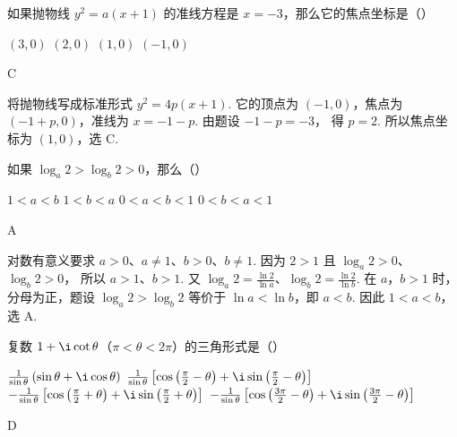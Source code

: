 \begin{problem}
如果抛物线 \(y^2=a(x+1)\) 的准线方程是 \(x=-3\)，那么它的焦点坐标是（\quad）

\choices
    {\((3,0)\)}
    {\((2,0)\)}
    {\((1,0)\)}
    {\((-1,0)\)}
\end{problem}

\begin{answer}
C
\end{answer}

\begin{solution}
将抛物线写成标准形式
\(y^2=4p(x+1)\).
它的顶点为 \((-1,0)\)，焦点为 \((-1+p,0)\)，准线为 \(x=-1-p\). 由题设
\(-1-p=-3\)，
得 \(p=2\). 所以焦点坐标为 \((1,0)\)，选 C.
\end{solution}

\begin{problem}
如果 \(\log_{a} 2 > \log_{b} 2 > 0 \)，那么（\quad）

\choices
    {\(1<a<b\)}
    {\(1<b<a\)}
    {\(0<a<b<1\)}
    {\(0<b<a<1\)}
\end{problem}

\begin{answer}
A
\end{answer}

\begin{solution}
对数有意义要求 \(a>0\)、\(a\ne1\)、\(b>0\)、\(b\ne1\). 因为 \(2>1\) 且
\(\log_a2>0\)、\(\log_b2>0\)，
所以 \(a>1\)、\(b>1\). 又
\(\log_a2=\frac{\ln2}{\ln a}\)、\(\log_b2=\frac{\ln2}{\ln b}\).
在 \(a\)，\(b>1\) 时，分母为正，题设 \(\log_a2>\log_b2\) 等价于 \(\ln a<\ln b\)，即 \(a<b\). 因此 \(1<a<b\)，选 A.
\end{solution}

\begin{problem}
复数 \(1+\i\cot\theta\)（\(\pi<\theta<2\pi\)）的三角形式是（\quad）

\choices
    {\(\frac{1}{\sin\theta}\left( \sin\theta+\i\cos\theta \right)\)}
    {\(\frac{1}{\sin\theta}\left[ \cos\left( \frac{\pi}{2}-\theta \right)+\i\sin\left( \frac{\pi}{2}-\theta \right) \right]\)}
    {\(-\frac{1}{\sin\theta}\left[ \cos\left( \frac{\pi}{2}+\theta \right)+\i\sin\left( \frac{\pi}{2}+\theta \right) \right]\)}
    {\(-\frac{1}{\sin\theta}\left[ \cos\left( \frac{3\pi}{2}-\theta \right)+\i\sin\left( \frac{3\pi}{2}-\theta \right) \right]\)}
\end{problem}

\begin{answer}
D
\end{answer}

